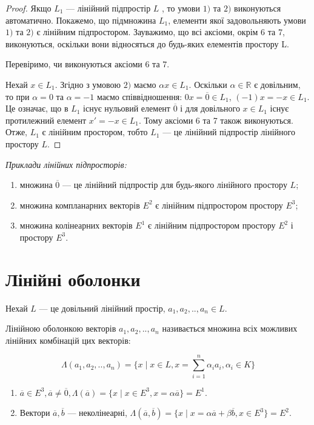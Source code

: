 \begin{proof}
	Якщо $L_1$ --- лінійний підпростір $L$ , то умови $1)$ та $2)$ виконуються
	автоматично. Покажемо, що підмножина $L_1$, елементи якої задовольняють умови
	$1)$ та $2)$ є лінійним підпростором. Зауважимо, що всі аксіоми, окрім 6 та 7,
	виконуються, оскільки вони відносяться до будь-яких елементів простору L.
	
	Перевіримо, чи виконуються аксіоми 6 та 7.
	
	Нехай $x \in L_1$. Згідно з умовою $2)$ маємо $\alpha x \in L_1$. Оскільки $\alpha \in \mathbb{R}$ є довільним,
	то при $\alpha = 0$ та $\alpha = -1$ маємо співвідношення: $0x = \overline{0} \in L_1$, $(-1)x = -x \in L_1$. Це
	означає, що в $L_1$ існує нульовий елемент $\overline{0}$ і для довільного $x \in L_1$ існує
	протилежний елемент $x' = -x \in L_1$. Тому аксіоми 6 та 7 також виконуються. Отже,
	$L_1$ є лінійним простором, тобто $L_1$ --- це лінійний підпростір лінійного простору $L$.
\end{proof}

\textit{Приклади лінійних підпросторів:}
\begin{enumerate}
	\item множина ${\overline{0}}$ --- це лінійний підпростір для будь-якого лінійного простору $L$;
	\item множина компланарних векторів $E^2$ є лінійним підпростором простору $E^3$;
	\item множина колінеарних векторів $E^1$ є лінійним підпростором простору $E^2$ і простору $E^3$. 
\end{enumerate}

\section{Лінійні оболонки}

Нехай $L$ --- це довільний лінійний простір, $a_1, a_2, ..,a_n \in L$.

\begin{definition}
	Лінійною оболонкою векторів $a_1, a_2, ..,a_n$ називається множина всіх
	можливих лінійних комбінацій цих векторів:
	
	$$\Lambda(a_1, a_2, ..,a_n) = \{x \mid x \in L, x = \sum\limits_{i=1}^n \alpha_i a_i, \alpha_i \in K\}$$
\end{definition}

\begin{example}
	\begin{enumerate}
		\item $\overline{a} \in E^3, \overline{a} \neq \overline{0}, \Lambda(\overline{a}) = \{x \mid x \in E^3, x = \alpha \overline{a}\} = E^1$.
		\item Вектори $\overline{a}, \overline{b}$ --- неколінеарні, $\Lambda(\overline{a}, \overline{b}) = \{x \mid x = \alpha \overline{a} + \beta \overline{b}, x \in E^3\} = E^2$.
	\end{enumerate}
\end{example}


